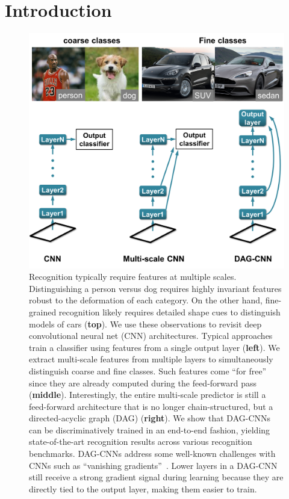 \documentclass[10pt,twocolumn,letterpaper]{article}
\begin{document}
\section{Introduction}


\begin{figure}[t!]
\centering
\includegraphics[width=\columnwidth]{fig/splash}
\caption{Recognition typically require features at multiple scales. Distinguishing a person versus dog requires highly invariant features robust to the deformation of each category. On the other hand, fine-grained recognition likely requires detailed shape cues to distinguish models of cars ({\bf top}). We use these observations to revisit deep convolutional neural net (CNN) architectures. Typical approaches train a classifier using features from a single output layer ({\bf left}). We extract multi-scale features from multiple layers to simultaneously distinguish coarse and fine classes. Such features come ``for free'' since they are already computed during the feed-forward pass ({\bf middle}). Interestingly, the entire multi-scale predictor is still a feed-forward architecture that is no longer chain-structured, but a directed-acyclic graph (DAG) ({\bf right}). We show that DAG-CNNs can be discriminatively trained in an end-to-end fashion, yielding state-of-the-art recognition results across various recognition benchmarks.  DAG-CNNs address some well-known challenges with CNNs such as ``vanishing gradients''~\cite{bengio1994learning}. Lower layers in a DAG-CNN still receive a strong gradient signal during learning because they are directly tied to the output layer, making them easier to train.
\label{fig:splash}}
\end{figure}
\end{document}
